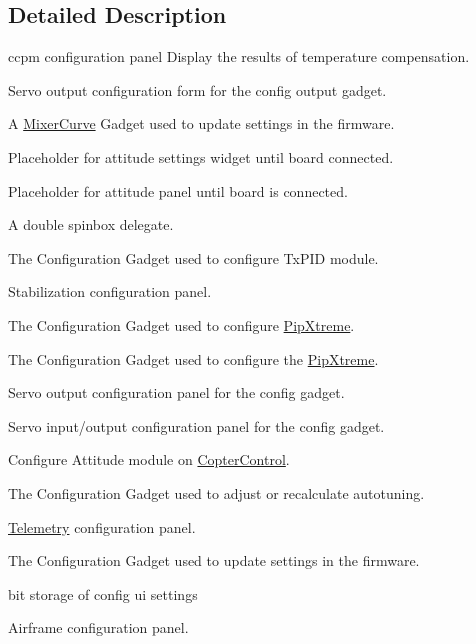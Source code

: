 \subsection{\-Detailed \-Description}
ccpm configuration panel \-Display the results of temperature compensation.

\-Servo output configuration form for the config output gadget.

\-A \hyperlink{class_mixer_curve}{\-Mixer\-Curve} \-Gadget used to update settings in the firmware.

\-Placeholder for attitude settings widget until board connected.

\-Placeholder for attitude panel until board is connected.

\-A double spinbox delegate.

\-The \-Configuration \-Gadget used to configure \-Tx\-P\-I\-D module.

\-Stabilization configuration panel.

\-The \-Configuration \-Gadget used to configure \hyperlink{class_pip_xtreme}{\-Pip\-Xtreme}.

\-The \-Configuration \-Gadget used to configure the \hyperlink{class_pip_xtreme}{\-Pip\-Xtreme}.

\-Servo output configuration panel for the config gadget.

\-Servo input/output configuration panel for the config gadget.

\-Configure \-Attitude module on \hyperlink{class_copter_control}{\-Copter\-Control}.

\-The \-Configuration \-Gadget used to adjust or recalculate autotuning.

\hyperlink{class_telemetry}{\-Telemetry} configuration panel.

\-The \-Configuration \-Gadget used to update settings in the firmware.

bit storage of config ui settings

\-Airframe configuration panel. 


